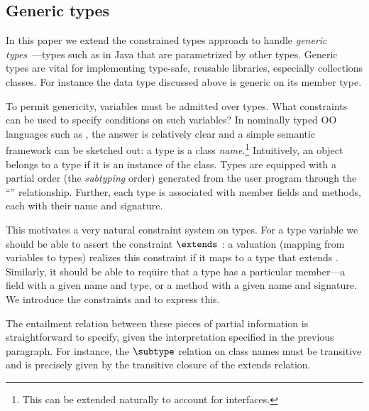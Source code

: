 \subsection{Generic types}

In this paper we extend the constrained types approach to handle {\em
generic
types}~\cite{clu,ada,GJ,java-popl97,thorup97,Java3,csharp-generics}---types
such as  in Java that are parametrized by other
types. Generic types are vital for implementing type-safe, reusable
libraries, especially collections classes. For instance the data type
 discussed above is generic on its member type.

To permit genericity, variables  must be admitted over types.
What constraints can be used to specify conditions on such variables?
In nominally typed OO languages such as \Java, the answer is
relatively clear and a simple semantic framework can be sketched out:
a type is a class \emph{name}.\footnote{This can be extended naturally
to account for interfaces.} Intuitively, an object belongs to a type
if it is an instance of the class. Types are equipped with a partial
order (the \emph{subtyping} order) generated from the user program
through the ``'' relationship.  Further, each type is
associated with member fields and methods, each with their
name and signature.
%

This motivates a very natural constraint system on types.  For a type
variable  we should be able to assert the constraint 
$\extends$ : a valuation (mapping from variables to types) realizes
this constraint if it maps  to a type that extends .
Similarly, it should be able to require that a type has a
particular member---a field with a given name and type, or a method
with a given name and signature. We introduce the constraints 
 and  to express this.

The entailment relation between these pieces of partial information is
straightforward to specify, given the interpretation specified in the
previous paragraph. For instance, the $\subtype$ relation on class
names must be transitive and is precisely given by the transitive
closure of the extends relation.

